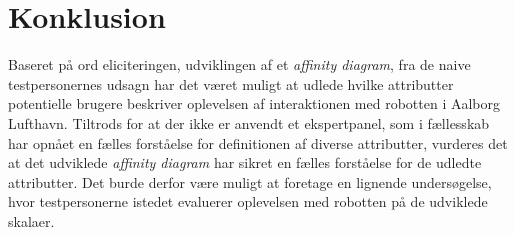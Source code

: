 \section*{Konklusion}
\label{Konklusion}
%
Baseret på ord eliciteringen, udviklingen af et \textit{affinity diagram}, fra de naive testpersonernes udsagn har det været muligt at udlede hvilke attributter potentielle brugere beskriver oplevelsen af interaktionen med robotten i Aalborg Lufthavn. Tiltrods for at der ikke er anvendt et ekspertpanel, som i fællesskab har opnået en fælles forståelse for definitionen af diverse attributter, vurderes det at det udviklede \textit{affinity diagram} har sikret en fælles forståelse for de udledte attributter. Det burde derfor være muligt at foretage en lignende undersøgelse, hvor testpersonerne istedet evaluerer oplevelsen med robotten på de udviklede skalaer.   